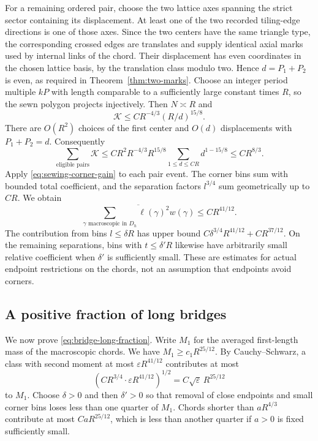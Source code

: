 For a remaining ordered pair, choose the two lattice axes spanning the strict sector containing its displacement. At least one of the two recorded tiling-edge directions is one of those axes. Since the two centers have the same triangle type, the corresponding crossed edges are translates and supply identical axial marks used by internal links of the chord. Their displacement has even coordinates in the chosen lattice basis, by the translation class modulo two. Hence $d=P_1+P_2$ is even, as required in Theorem~\ref{thm:two-marks}. Choose an integer period multiple $kP$ with length comparable to a sufficiently large constant times $R$, so the sewn polygon projects injectively. Then $N\asymp R$ and
\[
 \mathcal K\le C R^{-4/3}(R/d)^{15/8}.
\]
There are $O(R^2)$ choices of the first center and $O(d)$ displacements with $P_1+P_2=d$. Consequently
\begin{equation}\label{eq:marked-pair-sum}
 \sum_{\text{eligible pairs}}\mathcal K
 \le CR^2R^{-4/3}R^{15/8}\sum_{1\le d\le CR}d^{1-15/8}
 \le CR^{8/3}.
\end{equation}
Apply \eqref{eq:sewing-corner-gain} to each pair event. The corner bins sum with bounded total coefficient, and the separation factors $l^{3/4}$ sum geometrically up to $CR$. We obtain
\begin{equation}\label{eq:chord-second-moment}
 \overline{\sum_{\gamma\text{ macroscopic in }D_h}
       \ell(\gamma)^2w(\gamma)}\le CR^{41/12}.
\end{equation}
The contribution from bins $l\le\delta R$ has upper bound
$C\delta^{3/4}R^{41/12}+CR^{37/12}$. On the remaining separations, bins with $t\le\delta'R$ likewise have arbitrarily small relative coefficient when $\delta'$ is sufficiently small. These are estimates for actual endpoint restrictions on the chords, not an assumption that endpoints avoid corners.

\subsection{A positive fraction of long bridges}

We now prove \eqref{eq:bridge-long-fraction}. Write $M_1$ for the averaged first-length mass of the macroscopic chords. We have $M_1\ge c_1R^{25/12}$. By Cauchy--Schwarz, a class with second moment at most $\varepsilon R^{41/12}$ contributes at most
\[
 (CR^{3/4}\cdot\varepsilon R^{41/12})^{1/2}
 =C\sqrt\varepsilon\,R^{25/12}
\]
to $M_1$. Choose $\delta>0$ and then $\delta'>0$ so that removal of close endpoints and small corner bins loses less than one quarter of $M_1$. Chords shorter than $aR^{4/3}$ contribute at most $CaR^{25/12}$, which is less than another quarter if $a>0$ is fixed sufficiently small.

